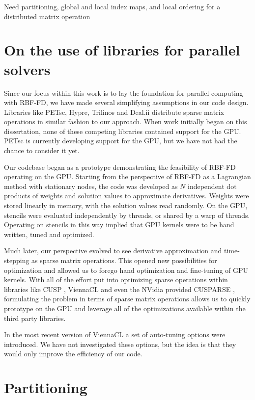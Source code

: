 \authnote{}Need partitioning, global and local index maps, and local ordering for a distributed matrix operation \cite{Saad2003} 

\section{On the use of libraries for parallel solvers}

Since our focus within this work is to lay the foundation for parallel computing
with RBF-FD, we have made several simplifying assumptions in our code design.
Libraries like PETsc, Hypre, Trilinos and Deal.ii distribute sparse matrix
operations in similar fashion to our approach. When work initially began on this
dissertation, none of these competing libraries contained support for the GPU.
PETsc is currently developing support for the GPU, but we have not had the
chance to consider it yet. 

Our codebase began as a prototype demonstrating the feasibility of RBF-FD
operating on the GPU. Starting from the perspective of RBF-FD as a Lagrangian
method with stationary nodes, the code was developed as $N$ independent dot
products of weights and solution values to approximate derivatives. Weights were
stored linearly in memory, with the solution values read randomly. On the GPU,
stencils were evaluated independently by threads, or shared by a warp of
threads. Operating on stencils in this way implied that GPU kernels were to be
hand written, tuned and optimized. 

Much later, our perspective evolved to see derivative approximation and
time-stepping as sparse matrix operations. This opened new possibilities for
optimization and allowed us to forego hand optimization and fine-tuning of GPU
kernels. With all of the effort put into optimizing sparse operations within
libraries like CUSP \cite{Bell2009}, ViennaCL \cite{Rupp2010} and even the
NVidia provided CUSPARSE \cite{CUSPARSE}, formulating the problem in terms of
sparse matrix operations allows us to quickly prototype on the GPU and leverage
all of the optimizations available within the third party libraries. 

In the most recent version of ViennaCL a set of auto-tuning options were
introduced. We have not investigated these options, but the idea is that they
would only improve the efficiency of our code. 


\section{Partitioning}


